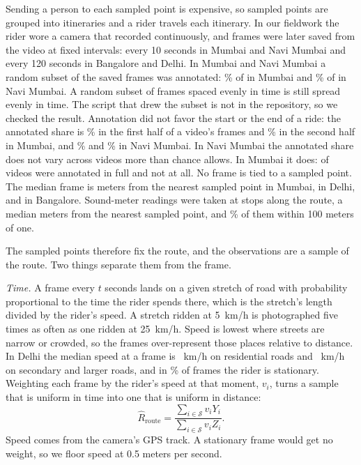 \documentclass[11pt]{article}
\newcommand{\Rhat}{\widehat{R}}
\newcommand{\sample}{\mathcal{S}}
\begin{document}
Sending a person to each sampled point is expensive, so sampled points are grouped into itineraries and a rider travels each itinerary. In our fieldwork the rider wore a camera that recorded continuously, and frames were later saved from the video at fixed intervals: every 10 seconds in Mumbai and Navi Mumbai and every 120 seconds in Bangalore and Delhi. In Mumbai and Navi Mumbai a random subset of the saved frames was annotated: \annotatedshareMumbai\% of \savedframesMumbai{} in Mumbai and \annotatedshareNaviMumbai\% of \savedframesNaviMumbai{} in Navi Mumbai. A random subset of frames spaced evenly in time is still spread evenly in time. The script that drew the subset is not in the repository, so we checked the result. Annotation did not favor the start or the end of a ride: the annotated share is \annotatedearlyMumbai\% in the first half of a video's frames and \annotatedlateMumbai\% in the second half in Mumbai, and \annotatedearlyNaviMumbai\% and \annotatedlateNaviMumbai\% in Navi Mumbai. In Navi Mumbai the annotated share does not vary across videos more than chance allows. In Mumbai it does: \videosfullMumbai{} of \videosMumbai{} videos were annotated in full and \videosnoneMumbai{} not at all. No frame is tied to a sampled point. The median frame is \nearestMumbai{} meters from the nearest sampled point in Mumbai, \nearestDelhi{} in Delhi, and \nearestBangalore{} in Bangalore. Sound-meter readings were taken at stops along the route, a median \noisenearest{} meters from the nearest sampled point, and \noisewithinhundred\% of them within 100 meters of one.

The sampled points therefore fix the route, and the observations are a sample of the route. Two things separate them from the frame.

\emph{Time.} A frame every $t$ seconds lands on a given stretch of road with probability proportional to the time the rider spends there, which is the stretch's length divided by the rider's speed. A stretch ridden at 5~km/h is photographed five times as often as one ridden at 25~km/h. Speed is lowest where streets are narrow or crowded, so the frames over-represent those places relative to distance. In Delhi the median speed at a frame is \kmhresidentialDelhi{}~km/h on residential roads and \kmhmajorDelhi{}~km/h on secondary and larger roads, and in \stoppedDelhi\% of frames the rider is stationary. Weighting each frame by the rider's speed at that moment, $v_i$, turns a sample that is uniform in time into one that is uniform in distance:
\begin{equation}
    \Rhat_{\text{route}} = \frac{\sum_{i \in \sample} v_i Y_i}{\sum_{i \in \sample} v_i Z_i}.
    \label{eq:speed}
\end{equation}
Speed comes from the camera's GPS track. A stationary frame would get no weight, so we floor speed at 0.5 meters per second.
\end{document}
